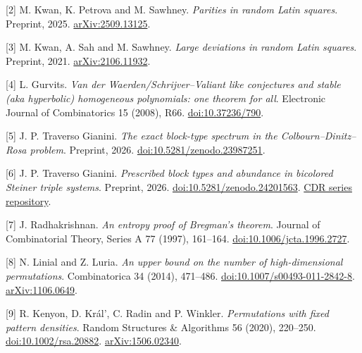 \documentclass[spanish,11pt,a4paper]{article}
\begin{document}
{[}2{]} M. Kwan, K. Petrova and M. Sawhney. \emph{Parities in random Latin squares}. Preprint, 2025. \href{https://arxiv.org/abs/2509.13125}{arXiv:2509.13125}.

{[}3{]} M. Kwan, A. Sah and M. Sawhney. \emph{Large deviations in random Latin squares}. Preprint, 2021. \href{https://arxiv.org/abs/2106.11932}{arXiv:2106.11932}.

{[}4{]} L. Gurvits. \emph{Van der Waerden/Schrijver--Valiant like conjectures and stable (aka hyperbolic) homogeneous polynomials: one theorem for all}. Electronic Journal of Combinatorics 15 (2008), R66. \href{https://doi.org/10.37236/790}{doi:10.37236/790}.

{[}5{]} J. P. Traverso Gianini. \emph{The exact block-type spectrum in the Colbourn--Dinitz--Rosa problem}. Preprint, 2026. \href{https://doi.org/10.5281/zenodo.23987251}{doi:10.5281/zenodo.23987251}.

{[}6{]} J. P. Traverso Gianini. \emph{Prescribed block types and abundance in bicolored Steiner triple systems}. Preprint, 2026. \href{https://doi.org/10.5281/zenodo.24201563}{doi:10.5281/zenodo.24201563}. \href{https://github.com/jtraverso/cdr-steiner-preprints}{CDR series repository}.

{[}7{]} J. Radhakrishnan. \emph{An entropy proof of Bregman's theorem}. Journal of Combinatorial Theory, Series A 77 (1997), 161--164. \href{https://doi.org/10.1006/jcta.1996.2727}{doi:10.1006/jcta.1996.2727}.

{[}8{]} N. Linial and Z. Luria. \emph{An upper bound on the number of high-dimensional permutations}. Combinatorica 34 (2014), 471--486. \href{https://doi.org/10.1007/s00493-011-2842-8}{doi:10.1007/s00493-011-2842-8}. \href{https://arxiv.org/abs/1106.0649}{arXiv:1106.0649}.

{[}9{]} R. Kenyon, D. Král', C. Radin and P. Winkler. \emph{Permutations with fixed pattern densities}. Random Structures \& Algorithms 56 (2020), 220--250. \href{https://doi.org/10.1002/rsa.20882}{doi:10.1002/rsa.20882}. \href{https://arxiv.org/abs/1506.02340}{arXiv:1506.02340}.

\endgroup
\end{document}
